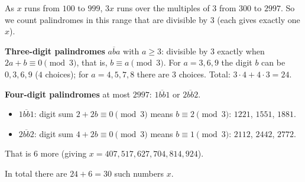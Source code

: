 As $x$ runs from $100$ to $999$, $3x$ runs over the multiples of $3$ from $300$ to $2997$. So we count palindromes in this range that are divisible by $3$ (each gives exactly one $x$).

\textbf{Three-digit palindromes} $\overline{aba}$ with $a\ge3$: divisible by $3$ exactly when $2a+b\equiv0\pmod3$, that is, $b\equiv a\pmod3$. For $a=3,6,9$ the digit $b$ can be $0,3,6,9$ ($4$ choices); for $a=4,5,7,8$ there are $3$ choices. Total: $3\cdot4+4\cdot3=24$.

\textbf{Four-digit palindromes} at most $2997$: $\overline{1bb1}$ or $\overline{2bb2}$.
\begin{itemize}
\item $\overline{1bb1}$: digit sum $2+2b\equiv0\pmod3$ means $b\equiv2\pmod3$: $1221$, $1551$, $1881$.
\item $\overline{2bb2}$: digit sum $4+2b\equiv0\pmod3$ means $b\equiv1\pmod3$: $2112$, $2442$, $2772$.
\end{itemize}
That is $6$ more (giving $x=407,517,627,704,814,924$).

In total there are $24+6=\boxed{30}$ such numbers $x$.
